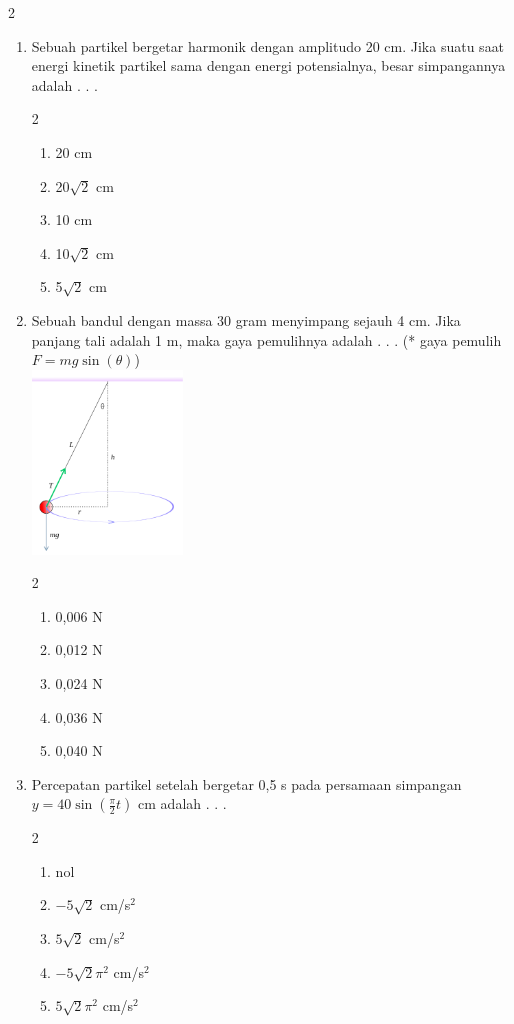 \documentclass[10pt,a4paper]{extarticle}
\newcommand{\pilgani}[1]{                            \vspace{-0.3cm}\begin{multicols}{2}
 \begin{enumerate}[label=\Alph*., itemsep=0pt,topsep=0pt,leftmargin=*,align=Center]#1                     \end{enumerate}
 \phantom{ini cuma sapi, wedus, dan ayam}
 \end{multicols}}
\begin{document}
\begin{multicols*}{2}
\begin{enumerate}
   \item Sebuah partikel bergetar harmonik dengan amplitudo 20 cm. Jika suatu saat energi kinetik partikel sama dengan energi potensialnya, besar simpangannya adalah . . .
   \pilgani{
      \item 20 cm
      \item 20$\sqrt{2}$ cm
      \item 10 cm
      \item 10$\sqrt{2}$ cm
      \item 5$\sqrt{2}$ cm
   }
   \vspace{2cm}

   \item Sebuah bandul dengan massa 30 gram menyimpang sejauh 4 cm. Jika panjang tali adalah 1 m, maka gaya pemulihnya adalah . . . (* gaya pemulih $F=mg \sin (\theta)$)\\ 
\includegraphics[width=4cm]{pic/pendulum} 
\pilgani{ \item 0,006 N
   \item 0,012 N
   \item 0,024 N
   \item 0,036 N
   \item 0,040 N
   }
   \vspace{2cm}

\item Percepatan partikel setelah bergetar 0,5 s pada persamaan simpangan $y = 40 \sin (\frac{\pi}{2}t)$ cm  adalah . . .
\pilgani{
   \item nol
   \item $-5\sqrt{2}$ cm/s$^2$
   \item $5\sqrt{2}$ cm/s$^2$
   \item $-5\sqrt{2}\pi^2$ cm/s$^2$
   \item $5\sqrt{2}\pi^2$ cm/s$^2$
}
\end{enumerate}
\end{multicols*}
\end{document}
